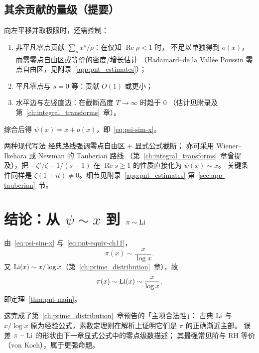 \subsection{其余贡献的量级（提要）}
向左平移并取极限时，还需控制：
\begin{enumerate}
  \item 非平凡零点贡献 $\sum_{\rho}x^{\rho}/\rho$：在仅知 $\operatorname{Re}\rho<1$ 时，
    不足以单独得到 $o(x)$，而需零点自由区或等价的密度/增长估计
    （Hadamard--de la Vallée Poussin 零点自由区，见附录~\ref{app:pnt_estimates}）；
  \item 平凡零点与 $s=0$ 等：贡献 $O(1)$ 或更小；
  \item 水平边与左竖直边：在截断高度 $T\to\infty$ 时趋于 $0$
    （估计见附录及第~\ref{ch:integral_transforms}~章）。
\end{enumerate}
综合后得 $\psi(x)=x+o(x)$，即~\eqref{eq:psi-sim-x}。

\begin{remark}{两种现代写法}{}
经典路线强调零点自由区 $+$ 显式公式截断；
亦可采用 Wiener--Ikehara 或 Newman 的 Tauberian 路线
（第~\ref{ch:integral_transforms}~章曾提及），把
$-\zeta'/\zeta-1/(s-1)$ 在 $\operatorname{Re}s\ge 1$ 的性质直接化为 $\psi(x)\sim x$。
关键条件同样是 $\zeta(1+it)\neq 0$。细节见附录~\ref{app:pnt_estimates} 第~\ref{sec:app-tauberian}~节。
\end{remark}

\section{结论：从 \texorpdfstring{$\psi\sim x$}{psi ~ x} 到 \texorpdfstring{$\pi\sim\operatorname{Li}$}{pi ~ Li}}\label{sec:pnt_conclude}

由~\eqref{eq:psi-sim-x} 与~\eqref{eq:pnt-equiv-ch11}，
\[
  \pi(x)\sim\frac{x}{\log x}.
\]
又 $\operatorname{Li}(x)\sim x/\log x$（第~\ref{ch:prime_distribution}~章），故
\[
  \pi(x)\sim\operatorname{Li}(x)\sim\frac{x}{\log x},
\]
即定理~\ref{thm:pnt-main}。

这完成了第~\ref{ch:prime_distribution}~章预告的「主项合法性」：
古典 $\operatorname{Li}$ 与 $x/\log x$ 原为经验公式，素数定理则在解析上证明它们是 $\pi$ 的正确渐近主部。
误差 $\pi-\operatorname{Li}$ 的形状由下一章显式公式中的零点级数描述；
其最强常见阶与 RH 等价（von Koch），属于更强命题。

